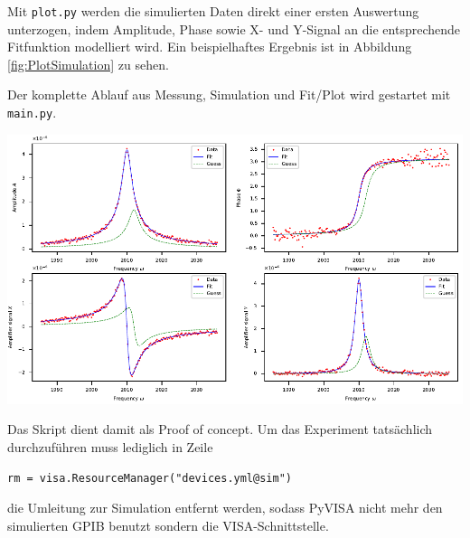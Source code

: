Mit \texttt{plot.py} werden die simulierten Daten direkt einer ersten Auswertung unterzogen, indem Amplitude, Phase sowie X- und Y-Signal an die entsprechende Fitfunktion modelliert wird.
Ein beispielhaftes Ergebnis ist in Abbildung \ref{fig:PlotSimulation} zu sehen.

Der komplette Ablauf aus Messung, Simulation und Fit/Plot wird gestartet mit \texttt{main.py}.

\minipage{\linewidth}
    \begin{center}
        \captionsetup{type=figure}
        \begin{adjustbox}{max width=\linewidth, keepaspectratio}
            \includegraphics[]{pdf/Simulation}
        \end{adjustbox}
        \label{fig:PlotSimulation}
    \end{center}
\endminipage

Das Skript dient damit als Proof of concept. Um das Experiment tatsächlich durchzuführen muss lediglich in Zeile
\begin{small}
\begin{lstlisting}[xleftmargin=10mm,numbers=none]
rm = visa.ResourceManager("devices.yml@sim")
\end{lstlisting}
\end{small}

die Umleitung zur Simulation entfernt werden, sodass PyVISA nicht mehr den simulierten GPIB benutzt sondern die VISA-Schnittstelle.
